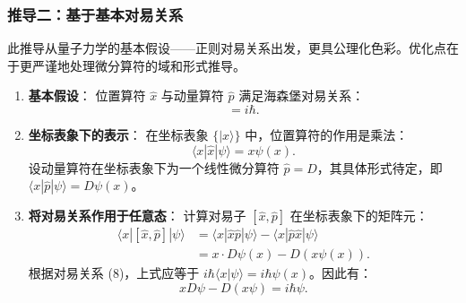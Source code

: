 \subsubsection*{推导二：基于基本对易关系}
\label{sec:com}

此推导从量子力学的基本假设——正则对易关系出发，更具公理化色彩。优化点在于更严谨地处理微分算符的域和形式推导。

\begin{enumerate}
	\item \textbf{基本假设}：
	位置算符 $\hat{x}$ 与动量算符 $\hat{p}$ 满足海森堡对易关系：
	\begin{equation}
		[\hat{x}, \hat{p}] = i\hbar.
	\end{equation}
	
	\item \textbf{坐标表象下的表示}：
	在坐标表象 $\{|x\rangle\}$ 中，位置算符的作用是乘法：
	\begin{equation}
		\langle x | \hat{x} | \psi \rangle = x \psi(x).
	\end{equation}
	设动量算符在坐标表象下为一个线性微分算符 $\hat{p} = D$，其具体形式待定，即 $\langle x | \hat{p} | \psi \rangle = D \psi(x)$。
	
	\item \textbf{将对易关系作用于任意态}：
	计算对易子 $[\hat{x}, \hat{p}]$ 在坐标表象下的矩阵元：
	\begin{align}
		\langle x | [\hat{x}, \hat{p}] | \psi \rangle &= \langle x | \hat{x}\hat{p} | \psi \rangle - \langle x | \hat{p}\hat{x} | \psi \rangle \nonumber \\
		&= x \cdot D\psi(x) - D\left( x \psi(x) \right).
	\end{align}
	根据对易关系 (8)，上式应等于 $i\hbar \langle x | \psi \rangle = i\hbar \psi(x)$。因此有：
	\begin{equation}
		x D\psi - D(x\psi) = i\hbar \psi.
		\label{eq:com_rel}
	\end{equation}
	

\end{enumerate}
